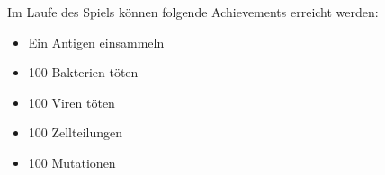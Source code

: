 Im Laufe des Spiels können folgende Achievements erreicht werden:
\begin{itemize}
  \item Ein Antigen einsammeln
  \item 100 Bakterien töten
  \item 100 Viren töten
  \item 100 Zellteilungen
  \item 100 Mutationen
\end{itemize}

